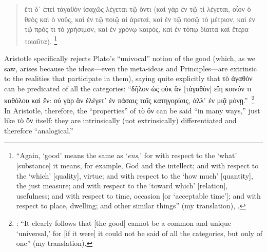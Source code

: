 \begin{quotation}
ἔτι δ᾽ ἐπεὶ τἀγαθὸν ἰσαχῶς λέγεται τῷ ὄντι (καὶ γὰρ ἐν τῷ τί λέγεται, οἷον ὁ θεὸς καὶ ὁ νοῦς, καὶ ἐν τῷ ποιῷ αἱ ἀρεταί, καὶ ἐν τῷ ποσῷ τὸ μέτριον, καὶ ἐν τῷ πρός τι τὸ χρήσιμον, καὶ ἐν χρόνῳ καιρός, καὶ ἐν τόπῳ δίαιτα καὶ ἕτερα τοιαῦτα).%
%
\footnote{\enquote{Again, \enquote{good} means the same as \enquote{\emph{ens},} for with respect to the \enquote{what} [substance] it means, for example, God and the intellect; and with respect to the \enquote{which} [quality], virtue; and with respect to the \enquote{how much} [quantity], the just measure; and with respect to the \enquote{toward which} [relation], usefulness; and with respect to time, occasion [or \enquote{acceptable time}]; and with respect to place, dwelling; and other similar things} (my translation), \cite[Α, 1, 1096a24-26]{aristotle:ethics}.}
%
\end{quotation}
%
Aristotle specifically rejects Plato’s \enquote{univocal} notion of the good (which, as we saw, arises because the ideas—even the meta-ideas and Principles—are extrinsic to the realities that participate in them), saying quite explicitly that τὸ ἀγαθόν can be predicated of all the categories: \enquote{δῆλον ὡς οὐκ ἂν [τἀγαθὸν] εἴη κοινόν τι καθόλου καὶ ἕν: οὐ γὰρ ἂν ἐλέγετ᾽ ἐν πάσαις ταῖς κατηγορίαις, ἀλλ᾽ ἐν μιᾷ μόνῃ.}\,%
%
\footnote{\Cite[Α, 1, 1096a28-30]{aristotle:ethics}: \enquote{It clearly follows that [the good] cannot be a common and unique \enquote{universal,} for [if it were] it could not be said of all the categories, but only of one} (my translation).}
%
In Aristotle, therefore, the \enquote{properties} of τὸ ὄν can be said \enquote{in many ways,} just like τὸ ὄν itself: they are intrinsically (not extrinsically) differentiated and therefore \enquote{analogical.}\,%
%
